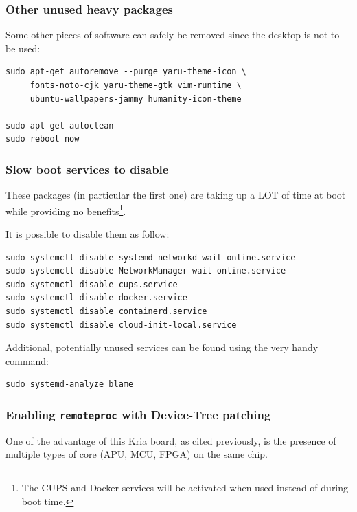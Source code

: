\documentclass[10pt]{article}
\begin{document}
\subsubsection{Other unused heavy packages}
\label{sec:orgedf9e81}
Some other pieces of software can safely be removed since the desktop is
not to be used:

\begin{verbatim}
sudo apt-get autoremove --purge yaru-theme-icon \
     fonts-noto-cjk yaru-theme-gtk vim-runtime \
     ubuntu-wallpapers-jammy humanity-icon-theme

sudo apt-get autoclean
sudo reboot now
\end{verbatim}

\subsubsection{Slow boot services to disable}
\label{sec:org7f4cef1}
These packages (in particular the first one) are taking up a LOT of time at boot while providing no benefits\footnote{The CUPS and Docker services will be activated when used instead of during boot time.}.

It is possible to disable them as follow:
\begin{verbatim}
sudo systemctl disable systemd-networkd-wait-online.service
sudo systemctl disable NetworkManager-wait-online.service
sudo systemctl disable cups.service
sudo systemctl disable docker.service
sudo systemctl disable containerd.service
sudo systemctl disable cloud-init-local.service
\end{verbatim}

Additional, potentially unused services can be found using the very handy command:
\begin{verbatim}
sudo systemd-analyze blame
\end{verbatim}

\subsubsection{Enabling \texttt{remoteproc} with Device-Tree patching}
\label{sec:org7214b47}
One of the advantage of this Kria board, as cited previously, is the presence of
multiple types of core (APU, MCU, FPGA) on the same chip.
\end{document}
